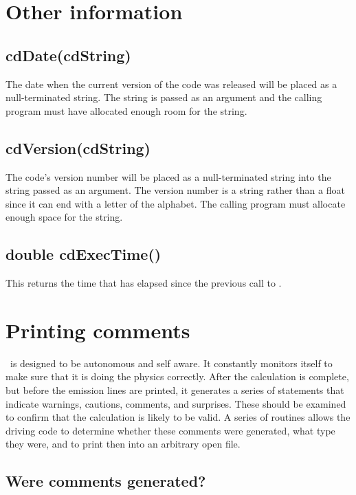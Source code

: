 \section{Other information}

\subsection{cdDate(cdString)}

The date when the current version of the code was released will be placed
as a null-terminated string.  The string is passed as an argument and the
calling program must have allocated enough room for the string.

\subsection{cdVersion(cdString)}

The code's version number will be placed as a null-terminated string
into the string passed as an argument.
The version number is a string rather
than a float since it can end with a letter of the alphabet.
The calling
program must allocate enough space for the string.

\subsection{double cdExecTime()}

This returns the time that has elapsed since the previous call
to .

\section{Printing comments}

\Cloudy\ is designed to be autonomous and self aware.
It constantly
monitors itself to make sure that it is doing the physics correctly.  After
the calculation is complete, but before the emission lines are printed,
it generates a series of statements that indicate warnings, cautions,
comments, and surprises.
These should be examined to confirm that the
calculation is likely to be valid.
A series of routines allows the driving
code to determine whether these comments were generated, what type they
were, and to print then into an arbitrary open file.

\subsection{Were comments generated?}

